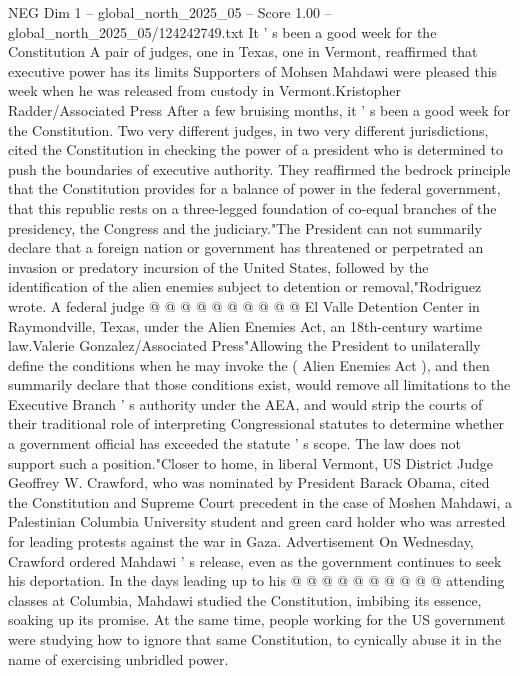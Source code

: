 \begin{textsample}{NEG Dim 1 – global\_north\_2025\_05 – Score 1.00 – global\_north\_2025\_05/124242749.txt}  \label{ex:f1_neg_232}
It ' s been a good week for the Constitution A pair of judges, one in Texas, one in Vermont, reaffirmed that executive power has its limits Supporters of Mohsen Mahdawi were pleased this week when he was released from custody in Vermont.Kristopher Radder/Associated Press After a few bruising months, it ' s been a good week for the Constitution.
Two very different judges, in two very different jurisdictions, cited the Constitution in checking the power of a president who is determined to push the boundaries of executive authority.
They reaffirmed the bedrock principle that the Constitution provides for a balance of power in the federal government, that this republic rests on a three-legged foundation of co-equal branches of the presidency, the Congress and the judiciary."The President can not summarily declare that a foreign nation or government has threatened or perpetrated an invasion or predatory incursion of the United States, followed by the identification of the alien enemies subject to detention or removal,"Rodriguez wrote.
A federal judge @ @ @ @ @ @ @ @ @ @ El Valle Detention Center in Raymondville, Texas, under the Alien Enemies Act, an 18th-century wartime law.Valerie Gonzalez/Associated Press"Allowing the President to unilaterally define the conditions when he may invoke the ( Alien Enemies Act ), and then summarily declare that those conditions exist, would remove all limitations to the Executive Branch ' s authority under the AEA, and would strip the courts of their traditional role of interpreting Congressional statutes to determine whether a government official has exceeded the statute ' s scope.
The law does not support such a position."Closer to home, in liberal Vermont, US District Judge Geoffrey W.
Crawford, who was nominated by President Barack Obama, cited the Constitution and Supreme Court precedent in the case of Moshen Mahdawi, a Palestinian Columbia University student and green card holder who was arrested for leading protests against the war in Gaza.
Advertisement On Wednesday, Crawford ordered Mahdawi ' s release, even as the government continues to seek his deportation.
In the days leading up to his @ @ @ @ @ @ @ @ @ @ attending classes at Columbia, Mahdawi studied the Constitution, imbibing its essence, soaking up its promise.
At the same time, people working for the US government were studying how to ignore that same Constitution, to cynically abuse it in the name of exercising unbridled power.

\end{textsample}
